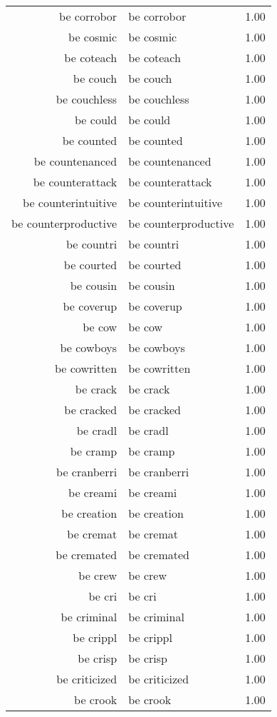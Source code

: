 \begin{table}[ht]
\begin{tabular}{rlr}
  be corrobor & be corrobor & 1.00 \\ 
  be cosmic & be cosmic & 1.00 \\ 
  be coteach & be coteach & 1.00 \\ 
  be couch & be couch & 1.00 \\ 
  be couchless & be couchless & 1.00 \\ 
  be could & be could & 1.00 \\ 
  be counted & be counted & 1.00 \\ 
  be countenanced & be countenanced & 1.00 \\ 
  be counterattack & be counterattack & 1.00 \\ 
  be counterintuitive & be counterintuitive & 1.00 \\ 
  be counterproductive & be counterproductive & 1.00 \\ 
  be countri & be countri & 1.00 \\ 
  be courted & be courted & 1.00 \\ 
  be cousin & be cousin & 1.00 \\ 
  be coverup & be coverup & 1.00 \\ 
  be cow & be cow & 1.00 \\ 
  be cowboys & be cowboys & 1.00 \\ 
  be cowritten & be cowritten & 1.00 \\ 
  be crack & be crack & 1.00 \\ 
  be cracked & be cracked & 1.00 \\ 
  be cradl & be cradl & 1.00 \\ 
  be cramp & be cramp & 1.00 \\ 
  be cranberri & be cranberri & 1.00 \\ 
  be creami & be creami & 1.00 \\ 
  be creation & be creation & 1.00 \\ 
  be cremat & be cremat & 1.00 \\ 
  be cremated & be cremated & 1.00 \\ 
  be crew & be crew & 1.00 \\ 
  be cri & be cri & 1.00 \\ 
  be criminal & be criminal & 1.00 \\ 
  be crippl & be crippl & 1.00 \\ 
  be crisp & be crisp & 1.00 \\ 
  be criticized & be criticized & 1.00 \\ 
  be crook & be crook & 1.00 \\ 

\end{tabular}
\end{table}
